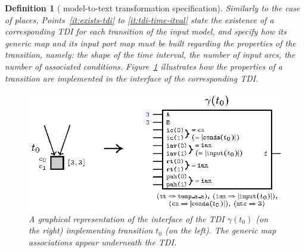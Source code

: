 \documentclass[pdflatex,sn-mathphys]{sn-jnl}%
\theoremstyle{thmstyleone}%
\theoremstyle{thmstyletwo}%
\theoremstyle{thmstylethree}%
\newtheorem{definition}{Definition}%
\begin{document}
\begin{definition}[\hilecop{} model-to-text transformation specification]
  \bigskip

  Similarly to the case of places, Points~\ref{it:exists-tdi} to
  \ref{it:tdi-time-itval} state the existence of a corresponding TDI
  for each transition of the input model, and specify how its generic
  map and its input port map must be built regarding the properties of
  the transition, namely: the shape of the time interval, the number
  of input arcs, the number of associated
  conditions. Figure~\ref{fig:gen-tdi-ex} illustrates how the
  properties of a transition are implemented in the interface of the
  corresponding TDI.

  \begin{figure}[h]
    \centering
    \includegraphics[keepaspectratio,width=.8\textwidth]{gen-tdi-ex.eps}
    \caption{A graphical representation of the interface of the TDI
      $\gamma(t_0)$ (on the right) implementing transition $t_0$ (on
      the left). The generic map associations appear underneath the
      TDI.}
    \label{fig:gen-tdi-ex}
  \end{figure}
  

\end{definition}
\end{document}
